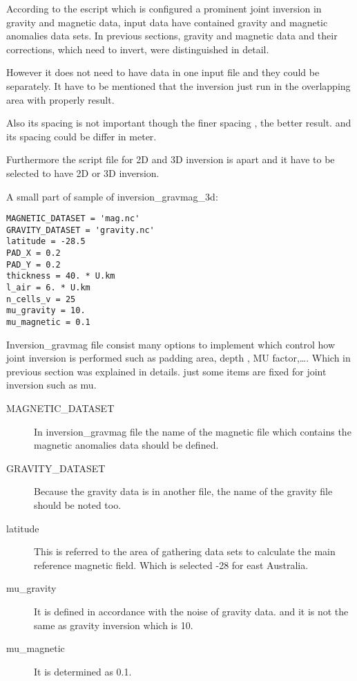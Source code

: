 According to the escript which is configured a prominent joint inversion in gravity and magnetic data, input data have contained gravity and magnetic anomalies data sets. In previous sections, gravity and magnetic data and their corrections, which need to invert, were distinguished in detail.

However it does not need to have data in one input file and they could be separately. It have to be mentioned that the inversion just run in the overlapping area with properly result.

Also its spacing is not important though the finer spacing , the better result. and its spacing could be differ in meter. 

Furthermore the script file for 2D and 3D inversion is apart and it have to be selected to have 2D or 3D inversion.

A small part of sample of inversion_gravmag_3d:

\begin{verbatim}
MAGNETIC_DATASET = 'mag.nc'
GRAVITY_DATASET = 'gravity.nc'
latitude = -28.5
PAD_X = 0.2
PAD_Y = 0.2
thickness = 40. * U.km
l_air = 6. * U.km
n_cells_v = 25
mu_gravity = 10.
mu_magnetic = 0.1
\end{verbatim}

Inversion_gravmag file consist many options to implement which control how joint inversion is performed such as padding area, depth , MU factor,\ldots. Which in previous section was explained in details. just some items are fixed for joint inversion such as mu.


\begin{description} 
\item[MAGNETIC_DATASET]In inversion_gravmag file the name of the magnetic file which contains the magnetic anomalies data should be defined.

\item[GRAVITY_DATASET]Because the gravity data is in another file, the name of the gravity file should be noted too.
	
\item[latitude]This is referred to the area of gathering data sets to calculate the main reference magnetic field. Which is selected -28 for east Australia.


\item[mu_gravity]It is defined in accordance with the noise of gravity data. and it is not the same as gravity inversion which is 10.

\item[mu_magnetic]It is determined as 0.1.

\end{description}


